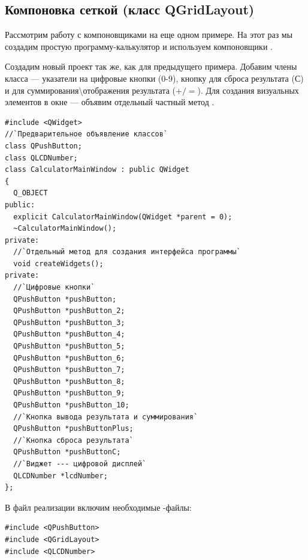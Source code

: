\subsection[Компоновка сеткой (класс QGridLayout)]{Компоновка сеткой (класс QGridLayout)}

Рассмотрим работу с компоновщиками на еще одном примере. На этот раз мы создадим простую программу-калькулятор и
используем компоновщики .

Создадим новый проект так же, как для предыдущего примера. Добавим члены класса --- указатели на цифровые кнопки (0-9),
кнопку для сброса результата (С) и для суммирования{\textbackslash}отображения результата ($+/=$). Для создания
визуальных элементов в окне --- объявим отдельный частный метод .
\begin{lstlisting}
#include <QWidget>
//`Предварительное объявление классов`
class QPushButton;
class QLCDNumber;
class CalculatorMainWindow : public QWidget
{
  Q_OBJECT
public:
  explicit CalculatorMainWindow(QWidget *parent = 0);
  ~CalculatorMainWindow();
private:
  //`Отдельный метод для создания интерфейса программы`
  void createWidgets();
private:
  //`Цифровые кнопки`
  QPushButton *pushButton;
  QPushButton *pushButton_2;
  QPushButton *pushButton_3;
  QPushButton *pushButton_4;
  QPushButton *pushButton_5;
  QPushButton *pushButton_6;
  QPushButton *pushButton_7;
  QPushButton *pushButton_8;
  QPushButton *pushButton_9;
  QPushButton *pushButton_10;
  //`Кнопка вывода результата и суммирования`
  QPushButton *pushButtonPlus;
  //`Кнопка сброса результата`
  QPushButton *pushButtonC;
  //`Виджет --- цифровой дисплей`
  QLCDNumber *lcdNumber;
};
\end{lstlisting}


В файл реализации включим необходимые -файлы:
\begin{lstlisting}
#include <QPushButton>
#include <QGridLayout>
#include <QLCDNumber>
\end{lstlisting}

